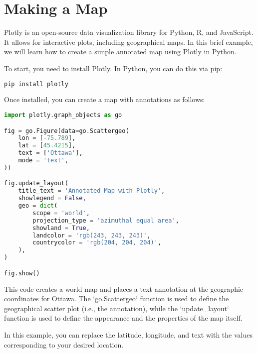 \chapter{Making a Map}


Plotly is an open-source data visualization library for Python, R, and JavaScript. It allows for interactive plots, including geographical maps. In this brief example, we will learn how to create a simple annotated map using Plotly in Python.

To start, you need to install Plotly. In Python, you can do this via pip:

\begin{lstlisting}[language=Python]
pip install plotly
\end{lstlisting}

Once installed, you can create a map with annotations as follows:

\begin{lstlisting}[language=Python]
import plotly.graph_objects as go

fig = go.Figure(data=go.Scattergeo(
    lon = [-75.789], 
    lat = [45.4215],
    text = ['Ottawa'],
    mode = 'text',
))

fig.update_layout(
    title_text = 'Annotated Map with Plotly',
    showlegend = False,
    geo = dict(
        scope = 'world',
        projection_type = 'azimuthal equal area',
        showland = True,
        landcolor = 'rgb(243, 243, 243)',
        countrycolor = 'rgb(204, 204, 204)',
    ),
)

fig.show()
\end{lstlisting}

This code creates a world map and places a text annotation at the geographic coordinates for Ottawa. The `go.Scattergeo` function is used to define the geographical scatter plot (i.e., the annotation), while the `update\_layout` function is used to define the appearance and the properties of the map itself.

In this example, you can replace the latitude, longitude, and text with the values corresponding to your desired location.
